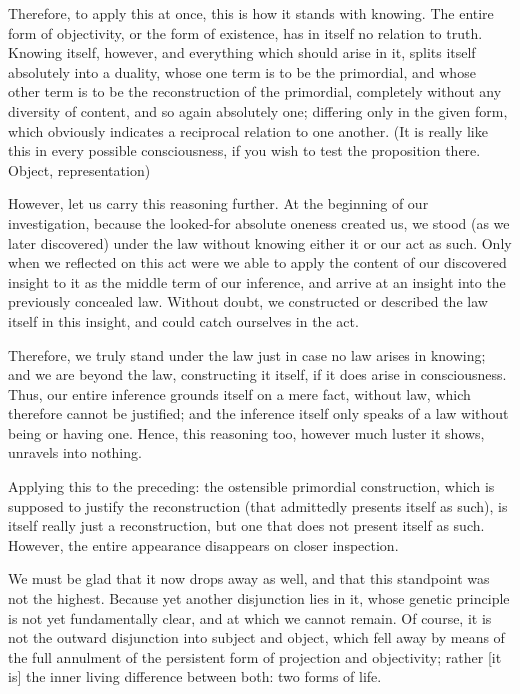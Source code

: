 Therefore, to apply this at once,
this is how it stands with knowing.
The entire form of objectivity,
or the form of existence,
has in itself no relation to truth.
Knowing itself, however,
and everything which should arise in it,
splits itself absolutely into a duality,
whose one term is to be the primordial,
and whose other term is to be
the reconstruction of the primordial,
completely without any diversity of content,
and so again absolutely one;
differing only in the given form,
which obviously indicates
a reciprocal relation to one another.
(It is really like this in every possible consciousness,
if you wish to test the proposition there.
Object, representation)

However, let us carry this reasoning further.
At the beginning of our investigation,
because the looked-for absolute oneness created us,
we stood (as we later discovered) under the law
without knowing either it or our act as such.
Only when we reflected on this act were
we able to apply the content of our discovered insight
to it as the middle term of our inference,
and arrive at an insight into the previously concealed law.
Without doubt, we constructed or described
the law itself in this insight,
and could catch ourselves in the act.

Therefore, we truly stand under the law
just in case no law arises in knowing;
and we are beyond the law,
constructing it itself,
if it does arise in consciousness.
Thus, our entire inference grounds itself on a mere fact,
without law, which therefore cannot be justified;
and the inference itself only speaks of a law
without being or having one.
Hence, this reasoning too, however much luster it shows,
unravels into nothing.

Applying this to the preceding:
the ostensible primordial construction,
which is supposed to justify the reconstruction
(that admittedly presents itself as such),
is itself really just a reconstruction,
but one that does not present itself as such.
However, the entire appearance disappears on closer inspection.

We must be glad that it now drops away as well,
and that this standpoint was not the highest.
Because yet another disjunction lies in it,
whose genetic principle is not yet fundamentally clear,
and at which we cannot remain.
Of course, it is not the outward
disjunction into subject and object,
which fell away by means of the full annulment
of the persistent form of projection and objectivity;
rather [it is] the inner living difference between both:
two forms of life.

